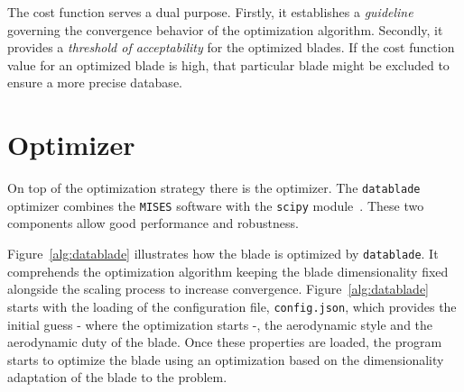
The cost function serves a dual purpose. Firstly, it establishes a \textit{guideline} governing the convergence behavior of 
the optimization algorithm. Secondly, it provides a \textit{threshold of acceptability} for the optimized blades. 
If the cost function value for an optimized blade is high, that particular blade might be excluded to ensure a more precise database.

\section{Optimizer}

On top of the optimization strategy there is the optimizer. 
The \texttt{datablade} optimizer combines the \texttt{MISES} software with the \texttt{scipy} module~\cite{2020SciPy-NMeth}.
These two components allow good performance and robustness. 

Figure~\ref{alg:datablade} illustrates how the blade is optimized by \texttt{datablade}.
It comprehends the optimization algorithm keeping the blade dimensionality fixed alongside 
the scaling process to increase convergence. Figure~\ref{alg:datablade} starts with the loading 
of the configuration file, \texttt{config.json}, which provides the initial guess - where the 
optimization starts -, the aerodynamic style and the aerodynamic duty of the blade. Once 
these properties are loaded, the program starts to optimize the blade using an
optimization based on the dimensionality adaptation of the blade to the problem. 


